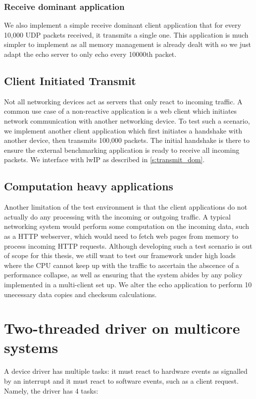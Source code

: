 \subsubsection{Receive dominant application}
We also implement a simple receive dominant client application that for every 10,000 UDP packets received, it transmits a single one.
This application is much simpler to implement as all memory management is already dealt with so we just adapt the echo server to 
only echo every 10000th packet.\\

\subsection{Client Initiated Transmit}
Not all networking devices act as servers that only react to incoming traffic. A common use case of a non-reactive application is a 
web client which initiates network communication with another networking device. To test such a scenario, we implement another client
application which first initiates a handshake with another device, then transmits 100,000 packets. The initial handshake is there to 
ensure the external benchmarking application is ready to receive all incoming packets. We interface with lwIP as described
in \ref{s:transmit_dom}.

\subsection{Computation heavy applications}
Another limitation of the test environment is that the client applications do not actually do any processing with the incoming or outgoing traffic.
A typical networking system would perform some computation on the incoming data, such as a HTTP webserver, which would need to fetch web pages from
memory to process incoming HTTP requests. Although developing such a test scenario is out of scope for this thesis, we still want to test
our framework under high loads where the CPU cannot keep up with the traffic to ascertain the abscence of a performance collapse, as well as
ensuring that the system abides by any policy implemented in a multi-client set up. We alter the echo application to perform 10 unecessary data copies
and checksum calculations.

\section{Two-threaded driver on multicore systems}
A device driver has multiple tasks: it must react to hardware events as signalled by an interrupt and it must react to software events,
such as a client request. Namely, the driver has 4 tasks:

